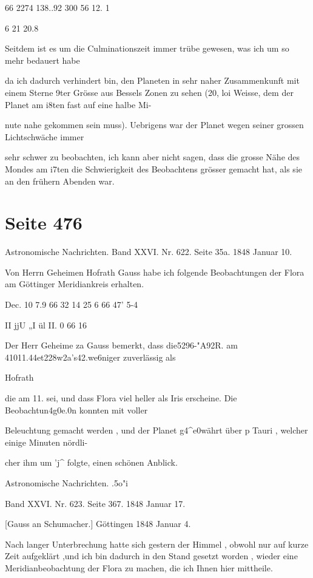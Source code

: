 \documentclass[10pt,a4paper]{article}
\begin{document}
66 2274 138..92 300 56 12. 1

6 21 20.8

Seitdem ist es um die Culminationszeit immer trübe gewesen, was ich um so mehr bedauert habe

da ich dadurch verhindert bin, den Planeten in sehr naher Zusammenkunft mit einem Sterne 9ter Grösse aus Bessels Zonen zu sehen (20, loi Weisse, dem der Planet am i8ten fast auf eine halbe Mi-

nute nahe gekommen sein muss). Uebrigens war der Planet wegen seiner grossen Lichtschwäche immer

sehr schwer zu beobachten, ich kann aber nicht sagen, dass die grosse Nähe des Mondes am i7ten die Schwierigkeit des Beobachtens grösser gemacht hat, als sie an den frühern Abenden war.


\newpage
\section*{Seite 476}
Astronomische Nachrichten. Band XXVI. Nr. 622. Seite 35a. 1848 Januar 10.

Von Herrn Geheimen Hofrath Gauss habe ich folgende Beobachtungen der Flora am Göttinger Meridiankreis erhalten.

Dec. 10 7.9 66 32 14 25 6 66\textdegree{} 47' 5-4

II jjU „I ül II. 0 66 16

Der Herr Geheime za Gauss bemerkt, dass die5296-"A92R. am 41011.44\textdegree{}et228w2a's42.we6niger zuverlässig als

Hofrath

die am 11. sei, und dass Flora viel heller als Iris erscheine. Die Beobachtun4g0e.0n konnten mit voller

Beleuchtung gemacht werden , und der Planet g4\textasciicircum{}e0währt über p Tauri , welcher einige Minuten nördli-

cher ihm um 'j\textasciicircum{} folgte, einen schönen Anblick.

Astronomische Nachrichten. .5o"i

Band XXVI. Nr. 623. Seite 367. 1848 Januar 17.

[Gauss an Schumacher.] Göttingen 1848 Januar 4.

Nach langer Unterbrechung hatte sich gestern der Himmel , obwohl nur auf kurze Zeit aufgeklärt ,und ich bin dadurch in den Stand gesetzt worden , wieder eine Meridianbeobachtung der Flora zu machen, die ich Ihnen hier mittheile.
\end{document}
